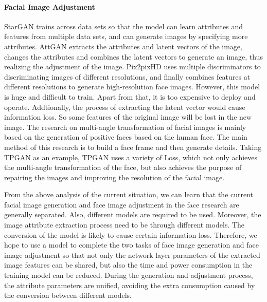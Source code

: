 \paragraph{Facial Image Adjustment}
StarGAN trains across data sets so that the model can learn attributes and features from multiple data sets,
    and can generate images by specifying more attributes.
AttGAN extracts the attributes and latent vectors of the image,
    changes the attributes and combines the latent vectors to generate an image,
    thus realizing the adjustment of the image.
Pix2pixHD uses multiple discriminators to discriminating images of different resolutions,
    and finally combines features at different resolutions to generate high-resolution face images.
However, this model is huge and difficult to train.
Apart from that, it is too expensive to deploy and operate.
Addtionally, the process of extracting the latent vector would cause information loss.
So some features of the original image will be lost in the new image.
The research on multi-angle transformation of facial images is mainly based on the generation of positive faces based on the human face.
The main method of this research is to build a face frame and then generate details.
Taking TPGAN as an example, TPGAN uses a variety of Loss,
    which not only achieves the multi-angle transformation of the face,
    but also achieves the purpose of repairing the images and improving the resolution of the facial image.

\vspace{3ex}

From the above analysis of the current situation,
    we can learn that the current facial image generation and face image adjustment in the face research are generally separated.
Also, different models are required to be used.
Moreover, the image attribute extraction process need to be through different models.
The conversion of the model is likely to cause certain information loss.
Therefore, we hope to use a model to complete the two tasks of face image generation and face image adjustment so that not only the network layer parameters of the extracted image features can be shared,
    but also the time and power consumption in the training model can be reduced.
During the generation and adjustment process, the attribute parameters are unified,
    avoiding the extra consumption caused by the conversion between different models.